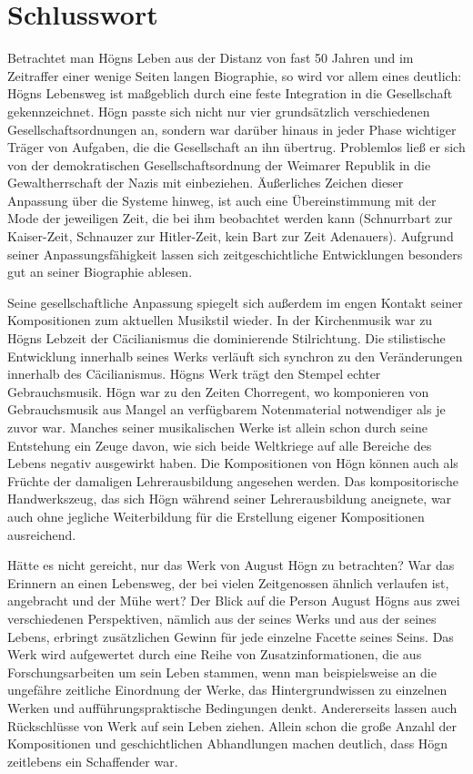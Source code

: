 \section{Schlusswort}

\hypertarget{RefHeadingToc100333756}{}Betrachtet man Högns Leben aus der
Distanz von fast 50 Jahren und im Zeitraffer einer wenige Seiten langen
Biographie, so wird vor allem eines deutlich: Högns Lebensweg ist
maßgeblich durch eine feste Integration in die Gesellschaft
gekennzeichnet. Högn passte sich nicht nur vier grundsätzlich
verschiedenen Gesellschaftsordnungen an, sondern war darüber hinaus in
jeder Phase wichtiger Träger von Aufgaben, die die Gesellschaft an ihn
übertrug. Problemlos ließ er sich von der demokratischen
Gesellschaftsordnung der Weimarer Republik in die Gewaltherrschaft der
Nazis mit einbeziehen. Äußerliches Zeichen dieser Anpassung über die
Systeme hinweg, ist auch eine Übereinstimmung mit der Mode der
jeweiligen Zeit, die bei ihm beobachtet werden kann (Schnurrbart zur
Kaiser-Zeit, Schnauzer zur Hitler-Zeit, kein Bart zur Zeit Adenauers).
Aufgrund seiner Anpassungsfähigkeit lassen sich zeitgeschichtliche
Entwicklungen besonders gut an seiner Biographie ablesen.

Seine gesellschaftliche Anpassung spiegelt sich außerdem im engen
Kontakt seiner Kompositionen zum aktuellen Musikstil wieder. In der
Kirchenmusik war zu Högns Lebzeit der Cäcilianismus die dominierende
Stilrichtung. Die stilistische Entwicklung innerhalb seines Werks
verläuft sich synchron zu den Veränderungen innerhalb des
Cäcilianismus. Högns Werk trägt den Stempel echter Gebrauchsmusik. Högn
war zu den Zeiten Chorregent, wo komponieren von Gebrauchsmusik aus
Mangel an verfügbarem Notenmaterial notwendiger als je zuvor war.
Manches seiner musikalischen Werke ist allein schon durch seine
Entstehung ein Zeuge davon, wie sich beide Weltkriege auf alle Bereiche
des Lebens negativ ausgewirkt haben. Die Kompositionen von Högn können
auch als Früchte der damaligen Lehrerausbildung angesehen werden. Das
kompositorische Handwerkszeug, das sich Högn während seiner
Lehrerausbildung aneignete, war auch ohne jegliche Weiterbildung für
die Erstellung eigener Kompositionen ausreichend.

Hätte es nicht gereicht, nur das Werk von August Högn zu betrachten? War
das Erinnern an einen Lebensweg, der bei vielen Zeitgenossen ähnlich
verlaufen ist, angebracht und der Mühe wert? Der Blick auf die Person
August Högns aus zwei verschiedenen Perspektiven, nämlich aus der
seines Werks und aus der seines Lebens, erbringt zusätzlichen Gewinn
für jede einzelne Facette seines Seins. Das Werk wird aufgewertet durch
eine Reihe von Zusatzinformationen, die aus Forschungsarbeiten um sein
Leben stammen, wenn man beispielsweise an die ungefähre zeitliche
Einordnung der Werke, das Hintergrundwissen zu einzelnen Werken und
aufführungspraktische Bedingungen denkt. Andererseits lassen auch
Rückschlüsse von Werk auf sein Leben ziehen. Allein schon die große
Anzahl der Kompositionen und geschichtlichen Abhandlungen machen
deutlich, dass Högn zeitlebens ein Schaffender war.

